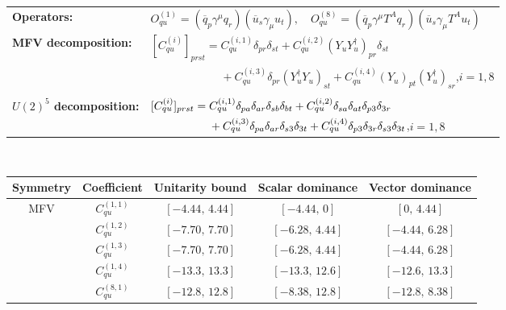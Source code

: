 \begin{table}[htbp]
\centering
{\small
\begin{tabular}{ll}
    \textbf{Operators:} &
        $\boxed{O_{qu}^{(1)} = (\overline q_p \gamma^\mu q_r)(\overline u_s \gamma_\mu u_t),\quad O_{qu}^{(8)} = (\overline q_p \gamma^\mu T^A q_r)(\overline u_s \gamma_\mu T^A u_t)}$ \\[0.2cm]
    \textbf{MFV decomposition:} &
        $[C_{qu}^{(i)}]_{prst} =
            C_{qu}^{(i,1)}\delta_{pr}\delta_{st}
            + C_{qu}^{(i,2)}(Y_u Y_u^\dagger)_{pr}\delta_{st}$ \\
        & $\phantom{[C_{qu}^{(i)}]_{prst} ={}}+ C_{qu}^{(i,3)}\delta_{pr}(Y_u^\dagger Y_u)_{st}
            + C_{qu}^{(i,4)}(Y_u)_{pt}(Y_u^\dagger)_{sr}$,\quad $i=1,8$ \\[0.15cm]
    \textbf{$U(2)^5$ decomposition:} &
        $[C_{qu}^{(i)}]_{prst} =
            C_{qu}^{(i,1)}\Pij{p}{r}{a}\Pij{s}{t}{b}
            + C_{qu}^{(i,2)}\Pij{s}{t}{a}\delta_{p3}\delta_{3r}$ \\
        & $\phantom{[C_{qu}^{(i)}]_{prst} ={}}+ C_{qu}^{(i,3)}\Pij{p}{r}{a}\delta_{s3}\delta_{3t}
            + C_{qu}^{(i,4)}\delta_{p3}\delta_{3r}\delta_{s3}\delta_{3t}$,\quad $i=1,8$ \\
\end{tabular}
\\[0.3cm]
\renewcommand{\arraystretch}{1.3}
\begin{tabular}{ccccc}
    \toprule
    \rowcolor{hdrcolor}
    \textbf{Symmetry} & \textbf{Coefficient}
        & \textbf{Unitarity bound}
        & \textbf{Scalar dominance}
        & \textbf{Vector dominance} \\
    \midrule
    \multirow{8}{*}{MFV}
        & $C_{qu}^{(1,1)}$ & $[-4.44,\, 4.44]$ & $[-4.44,\, 0]$    & $[0,\, 4.44]$    \\
        & $C_{qu}^{(1,2)}$ & $[-7.70,\, 7.70]$ & $[-6.28,\, 4.44]$ & $[-4.44,\, 6.28]$ \\
        & $C_{qu}^{(1,3)}$ & $[-7.70,\, 7.70]$ & $[-6.28,\, 4.44]$ & $[-4.44,\, 6.28]$ \\
        & $C_{qu}^{(1,4)}$ & $[-13.3,\, 13.3]$ & $[-13.3,\, 12.6]$ & $[-12.6,\, 13.3]$ \\
        & $C_{qu}^{(8,1)}$ & $[-12.8,\, 12.8]$ & $[-8.38,\, 12.8]$ & $[-12.8,\, 8.38]$ \\

\end{tabular}}
\end{table}

